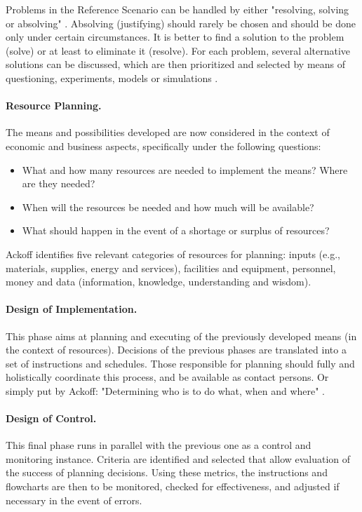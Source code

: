 \documentclass[a4paper,12pt]{article}
\begin{document}
Problems in the Reference Scenario can be handled by either "resolving,
solving or absolving" \cite{ackoff:1981}. Absolving (justifying) should rarely
be chosen and should be done only under certain circumstances.  It is better
to find a solution to the problem (solve) or at least to eliminate it
(resolve).  For each problem, several alternative solutions can be discussed,
which are then prioritized and selected by means of questioning, experiments,
models or simulations \cite{ackoff:1981}.

\paragraph{Resource  Planning.} 
The means and possibilities developed are now considered in the context of
economic and business aspects, specifically under the following questions:
\begin{itemize}
\item What and how many resources are needed to implement the means? Where are
  they needed?
\item When will the resources be needed and how much will be available?
\item What should happen in the event of a shortage or surplus of resources?
\end{itemize}
Ackoff identifies five relevant categories of resources for planning: inputs
(e.g., materials, supplies, energy and services), facilities and equipment,
personnel, money and data (information, knowledge, understanding and wisdom).

\paragraph{Design of Implementation.} 
This phase aims at planning and executing of the previously developed means
(in the context of resources). Decisions of the previous phases are translated
into a set of instructions and schedules. Those responsible for planning
should fully and holistically coordinate this process, and be available as
contact persons. Or simply put by Ackoff: "Determining who is to do what,
when and where" \cite{ackoff:2001}.

\paragraph{Design of Control.} 
This final phase runs in parallel with the previous one as a control and
monitoring instance. Criteria are identified and selected that allow
evaluation of the success of planning decisions. Using these metrics, the
instructions and flowcharts are then to be monitored, checked for
effectiveness, and adjusted if necessary in the event of errors.
\end{document}

